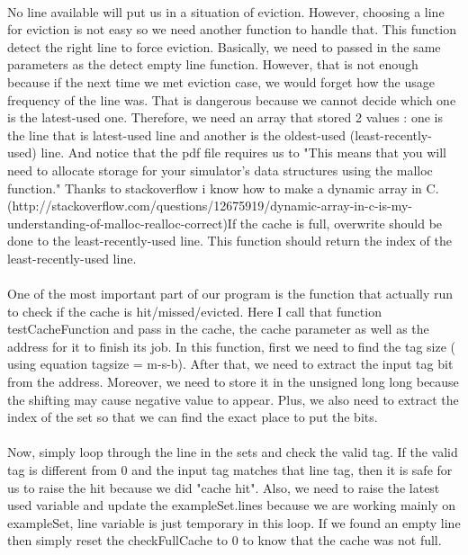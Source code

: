 \documentclass[a4paper]{article}
\begin{document}
\paragraph{} 
No line available will put us in a situation of eviction. However, choosing a line for eviction is not easy so we need another function to handle that. This function detect the right line to force eviction. Basically, we need to passed in the same 
parameters as the detect empty line function. However, that is not enough because if the next time we met eviction case, we would forget how the usage frequency of the line was. That is dangerous because we cannot decide which one is the latest-used one. Therefore, we need an array that stored 2 values : one is the line that is latest-used line and another is the oldest-used (least-recently-used) line. And notice that the pdf file requires us to "This means that you will need to allocate storage for your simulator’s data structures using the malloc function." Thanks to stackoverflow i know how to make a dynamic array in C. (http://stackoverflow.com/questions/12675919/dynamic-array-in-c-is-my-understanding-of-malloc-realloc-correct)If the cache is full, overwrite should be done to the least-recently-used line.  This function should return the index of the least-recently-used line.   


\paragraph{} 
One of the most important part of our program is the function that actually run to check if the cache is hit/missed/evicted. Here I call that function testCacheFunction and pass in the cache, the cache parameter as well as the address for it to finish its job. In this function, first we need to find the tag size ( using equation tagsize = m-s-b). After that, we need to extract the input tag bit from the address. Moreover, we need to store it in the unsigned long long because the shifting may cause negative value to appear. Plus, we also need to extract the index of the set so that we can find the exact place to put the bits.  

\paragraph{} 
Now, simply loop through the line in the sets and check the valid tag. If the valid tag is different from 0 and the input tag matches that line tag, then it is safe for us to raise the hit because we did "cache hit". Also, we need to raise the latest used variable and update the exampleSet.lines because we are working mainly on exampleSet, line variable is just temporary in this loop. If we found an empty line then simply reset the checkFullCache to 0 to know that the cache was not full.  
\end{document}
